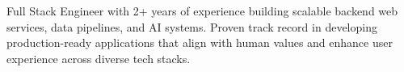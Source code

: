 Full Stack Engineer with 2+ years of experience building scalable backend web services, data pipelines, and AI systems. Proven track record in developing production-ready applications that align with human values and enhance user experience across diverse tech stacks.